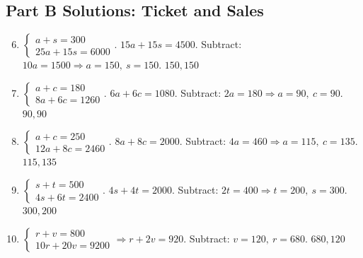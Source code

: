 \documentclass[14pt]{extarticle}
\begin{document}
\subsection*{Part B Solutions: Ticket and Sales}
\begin{enumerate}
  \setcounter{enumi}{5}
  \item \(\begin{cases} a+s=300 \\ 25a+15s=6000 \end{cases}\).  
  \(15a+15s=4500\). Subtract: \(10a=1500 \Rightarrow a=150,\ s=150\). \(\boxed{150,150}\)

  \item \(\begin{cases} a+c=180 \\ 8a+6c=1260 \end{cases}\).  
  \(6a+6c=1080\). Subtract: \(2a=180 \Rightarrow a=90,\ c=90\). \(\boxed{90,90}\)

  \item \(\begin{cases} a+c=250 \\ 12a+8c=2460 \end{cases}\).  
  \(8a+8c=2000\). Subtract: \(4a=460 \Rightarrow a=115,\ c=135\). \(\boxed{115,135}\)

  \item \(\begin{cases} s+t=500 \\ 4s+6t=2400 \end{cases}\).  
  \(4s+4t=2000\). Subtract: \(2t=400 \Rightarrow t=200,\ s=300\). \(\boxed{300,200}\)

  \item \(\begin{cases} r+v=800 \\ 10r+20v=9200 \end{cases}\Rightarrow r+2v=920\).  
  Subtract: \(v=120,\ r=680\). \(\boxed{680,120}\)
\end{enumerate}
\end{document}
